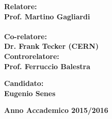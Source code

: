 \begin{titlepage}
\begin{minipage}[t]{0.47\textwidth}
{\large{\bf Relatore:\\
Prof. Martino Gagliardi}}\\
\vspace{4mm}
\\
{\large{\bf Co-relatore:\\
Dr. Frank Tecker (CERN)}}
\vspace{8mm}
{\large{\bf \\ Controrelatore:\\
Prof. Ferruccio Balestra}}
\end{minipage}
\hfill
\begin{minipage}[t]{0.47\textwidth}\raggedleft
\vspace{20mm}
{\large{\bf Candidato:\\
Eugenio Senes}}
\end{minipage}
\vspace{10mm}
\begin{center}
{\large{\bf 
Anno Accademico 2015/2016}}
\end{center}

\end{titlepage}